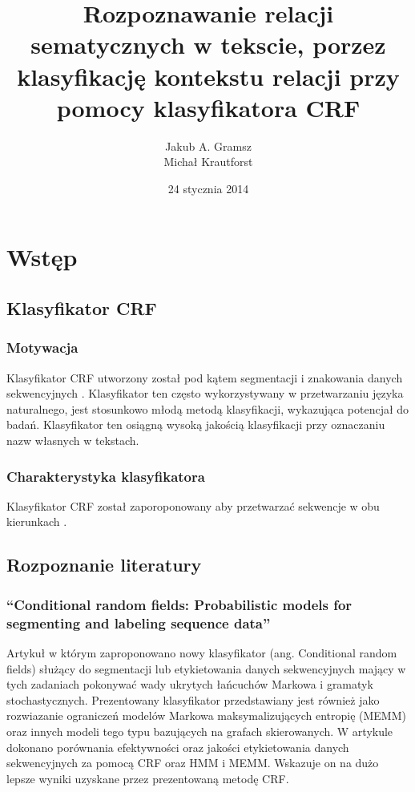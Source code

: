 \documentclass[a4paper,10pt]{report}
\title{Rozpoznawanie relacji sematycznych w tekscie, porzez klasyfikację kontekstu relacji przy pomocy klasyfikatora \textbf{CRF}}
\author{Jakub A. Gramsz \\ Michał Krautforst}
\date{24 stycznia 2014}
\begin{document}
\renewcommand{\figurename}{Wykres}
\renewcommand{\chaptername}{}

\maketitle
\tableofcontents

\chapter{Wstęp} %

\section{Klasyfikator CRF} 

\subsection{Motywacja}

Klasyfikator CRF utworzony został pod kątem segmentacji i znakowania danych sekwencyjnych \cite{lafferty2001crf}. Klasyfikator ten często wykorzystywany w przetwarzaniu języka naturalnego, jest stosunkowo młodą metodą klasyfikacji, wykazująca potencjał do badań. Klasyfikator ten osiągną wysoką jakością klasyfikacji przy oznaczaniu nazw własnych w tekstach.

\subsection{Charakterystyka klasyfikatora}

Klasyfikator CRF został zaporoponowany aby przetwarzać sekwencje w obu kierunkach \cite{lafferty2001crf}.

\section{Rozpoznanie literatury}

\subsection{``Conditional random fields: Probabilistic models for segmenting and labeling sequence data'' \cite{lafferty2001crf}}

Artykuł w którym zaproponowano nowy klasyfikator (ang. Conditional random fields) służący do segmentacji lub etykietowania danych sekwencyjnych mający w tych zadaniach pokonywać wady ukrytych łańcuchów Markowa i gramatyk stochastycznych. Prezentowany klasyfikator przedstawiany jest również jako rozwiazanie ograniczeń modelów Markowa maksymalizujących entropię (MEMM) oraz innych modeli tego typu bazujących na grafach skierowanych. W artykule dokonano porównania efektywności oraz jakości etykietowania danych sekwencyjnych za pomocą CRF oraz HMM i MEMM. Wskazuje on na dużo lepsze wyniki uzyskane przez prezentowaną metodę CRF. 
\end{document}
